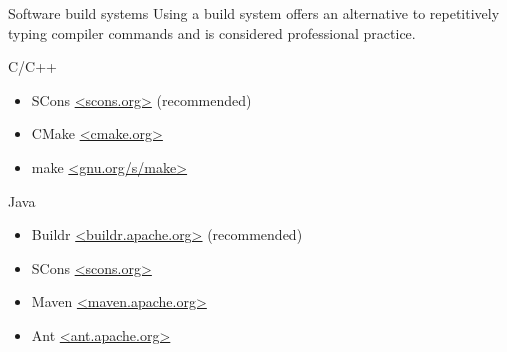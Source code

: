 \begin{block}{Software build systems}
  Using a build system offers an alternative to repetitively typing compiler commands and is considered professional practice.
  \begin{indented_itemize}
  \item C/C++
    \begin{itemize}
    \item SCons \url{<scons.org>} (recommended)
    \item CMake \url{<cmake.org>}
    \item make \url{<gnu.org/s/make>}
    \end{itemize}
  \item Java
    \begin{itemize}
    \item Buildr \url{<buildr.apache.org>} (recommended)
    \item SCons \url{<scons.org>}
    \item Maven \url{<maven.apache.org>}
    \item Ant \url{<ant.apache.org>}
    \end{itemize}
  \end{indented_itemize}
\end{block}
